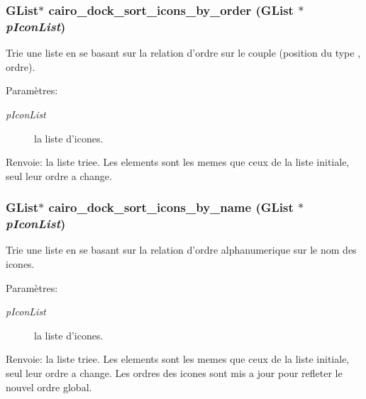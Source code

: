 \subsubsection{\setlength{\rightskip}{0pt plus 5cm}GList$\ast$ cairo\_\-dock\_\-sort\_\-icons\_\-by\_\-order (GList $\ast$ {\em pIconList})}\label{cairo-dock-icons_8h_f1bef19a6b85b6a6e27feb40cefd400b}


Trie une liste en se basant sur la relation d'ordre sur le couple (position du type , ordre). \begin{Desc}
\item[Paramètres:]
\begin{description}
\item[{\em pIconList}]la liste d'icones. \end{description}
\end{Desc}
\begin{Desc}
\item[Renvoie:]la liste triee. Les elements sont les memes que ceux de la liste initiale, seul leur ordre a change. \end{Desc}
\subsubsection{\setlength{\rightskip}{0pt plus 5cm}GList$\ast$ cairo\_\-dock\_\-sort\_\-icons\_\-by\_\-name (GList $\ast$ {\em pIconList})}\label{cairo-dock-icons_8h_a78c3612a56f84f0e0765bd26c7510a4}


Trie une liste en se basant sur la relation d'ordre alphanumerique sur le nom des icones. \begin{Desc}
\item[Paramètres:]
\begin{description}
\item[{\em pIconList}]la liste d'icones. \end{description}
\end{Desc}
\begin{Desc}
\item[Renvoie:]la liste triee. Les elements sont les memes que ceux de la liste initiale, seul leur ordre a change. Les ordres des icones sont mis a jour pour refleter le nouvel ordre global. \end{Desc}

